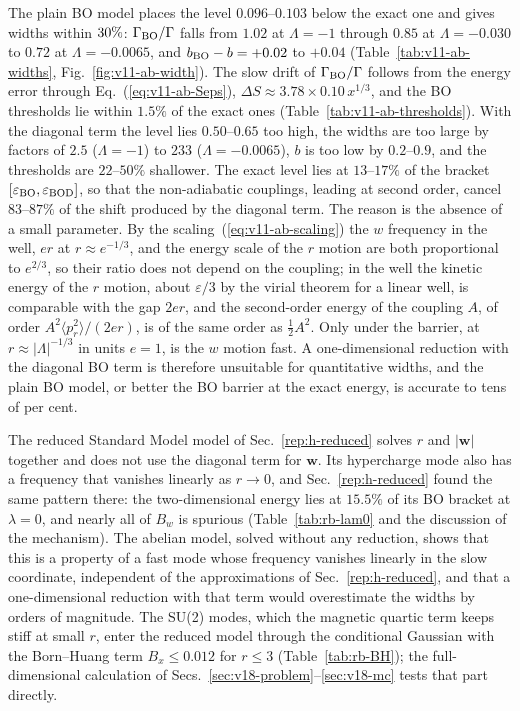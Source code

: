 The plain BO model places the level $0.096$--$0.103$ below the exact one and gives widths within $30\%$: $\Gamma_{\rm BO}/\Gamma$ falls from $1.02$ at $\Lambda=-1$ through $0.85$ at $\Lambda=-0.030$ to $0.72$ at $\Lambda=-0.0065$, and $b_{\rm BO}-b=+0.02$ to $+0.04$ (Table~\ref{tab:v11-ab-widths}, Fig.~\ref{fig:v11-ab-width}). %
The slow drift of $\Gamma_{\rm BO}/\Gamma$ follows from the energy error through Eq.~(\ref{eq:v11-ab-Seps}), $\Delta S\approx3.78\times0.10\,x^{1/3}$, and the BO thresholds lie within $1.5\%$ of the exact ones (Table~\ref{tab:v11-ab-thresholds}). %
With the diagonal term the level lies $0.50$--$0.65$ too high, the widths are too large by factors of $2.5$ ($\Lambda=-1$) to $233$ ($\Lambda=-0.0065$), $b$ is too low by $0.2$--$0.9$, and the thresholds are $22$--$50\%$ shallower. %
The exact level lies at $13$--$17\%$ of the bracket $[\varepsilon_{\rm BO},\varepsilon_{\rm BOD}]$, so that the non-adiabatic couplings, leading at second order, cancel $83$--$87\%$ of the shift produced by the diagonal term. %
The reason is the absence of a small parameter.
By the scaling~(\ref{eq:v11-ab-scaling}) the $w$ frequency in the well, $er$ at $r\approx e^{-1/3}$, and the energy scale of the $r$ motion are both proportional to $e^{2/3}$, so their ratio does not depend on the coupling; in the well the kinetic energy of the $r$ motion, about $\varepsilon/3$ by the virial theorem for a linear well, is comparable with the gap $2er$, and the second-order energy of the coupling $A$, of order $A^2\langle p_r^2\rangle/(2er)$, is of the same order as $\frac12A^2$.
Only under the barrier, at $r\approx|\Lambda|^{-1/3}$ in units $e=1$, is the $w$ motion fast.
A one-dimensional reduction with the diagonal BO term is therefore unsuitable for quantitative widths, and the plain BO model, or better the BO barrier at the exact energy, is accurate to tens of per cent.

The reduced Standard Model model of Sec.~\ref{rep:h-reduced} solves $r$ and $|\bm w|$ together and does not use the diagonal term for $\bm w$.
Its hypercharge mode also has a frequency that vanishes linearly as $r\to0$, and Sec.~\ref{rep:h-reduced} found the same pattern there: the two-dimensional energy lies at $15.5\%$ of its BO bracket at $\lambda=0$, and nearly all of $B_w$ is spurious (Table~\ref{tab:rb-lam0} and the discussion of the mechanism). %
The abelian model, solved without any reduction, shows that this is a property of a fast mode whose frequency vanishes linearly in the slow coordinate, independent of the approximations of Sec.~\ref{rep:h-reduced}, and that a one-dimensional reduction with that term would overestimate the widths by orders of magnitude.
The SU(2) modes, which the magnetic quartic term keeps stiff at small $r$, enter the reduced model through the conditional Gaussian with the Born--Huang term $B_x\le0.012$ for $r\le3$ (Table~\ref{tab:rb-BH}); the full-dimensional calculation of Secs.~\ref{sec:v18-problem}--\ref{sec:v18-mc} tests that part directly. %

